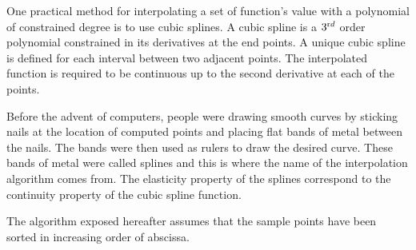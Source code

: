 One practical method for interpolating a set of function's value
with a polynomial of constrained degree is to use cubic splines. A
cubic spline is a $3^{\mathop{\textrm rd}}$ order polynomial
constrained in its derivatives at the end points. A unique cubic
spline is defined for each interval between two adjacent points.
The interpolated function is required to be continuous up to the
second derivative at each of the points.

Before the advent of computers, people were drawing smooth curves
by sticking nails at the location of computed points and placing
flat bands of metal between the nails. The bands were then used as
rulers to draw the desired curve. These bands of metal were called
splines and this is where the name of the interpolation algorithm
comes from. The elasticity property of the splines correspond to
the continuity property of the cubic spline function.

The algorithm exposed hereafter assumes that the sample points
have been sorted in increasing order of abscissa.

